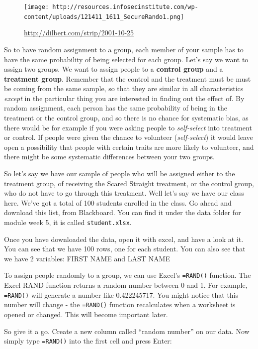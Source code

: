 \documentclass[
]{book}
\begin{document}
\begin{figure}
\centering
\texttt{[image: http://resources.infosecinstitute.com/wp-content/uploads/121411\_1611\_SecureRando1.png]}
\caption{\url{http://dilbert.com/strip/2001-10-25}}
\end{figure}

So to have random assignment to a group, each member of your sample has to have the same probability of being selected for each group. Let's say we want to assign two groups. We want to assign people to a \textbf{control group} and a \textbf{treatment group}. Remember that the control and the treatment must be must be coming from the same sample, so that they are similar in all characteristics \emph{except} in the particular thing you are interested in finding out the effect of. By random assignment, each person has the same probability of being in the treatment or the control group, and so there is no chance for systematic bias, as there would be for example if you were asking people to \emph{self-select} into treatment or control. If people were given the chance to volunteer (\emph{self-select}) it would leave open a possibility that people with certain traits are more likely to volunteer, and there might be some systematic differences between your two groups.

So let's say we have our sample of people who will be assigned either to the treatment group, of receiving the Scared Straight treatment, or the control group, who do not have to go through this treatment. Well let's say we have our class here. We've got a total of 100 students enrolled in the class. Go ahead and download this list, from Blackboard. You can find it under the data folder for module week 5, it is called \texttt{student.xlsx}.

Once you have downloaded the data, open it with excel, and have a look at it. You can see that we have 100 rows, one for each student. You can also see that we have 2 variables: FIRST NAME and LAST NAME

To assign people randomly to a group, we can use Excel's \texttt{=RAND()} function. The Excel RAND function returns a random number between 0 and 1. For example, \texttt{=RAND()} will generate a number like 0.422245717. You might notice that this number will change - the \texttt{=RAND()} function recalculates when a worksheet is opened or changed. This will become important later.

So give it a go. Create a new column called ``random number'' on our data. Now simply type \texttt{=RAND()} into the first cell and press Enter:
\end{document}
